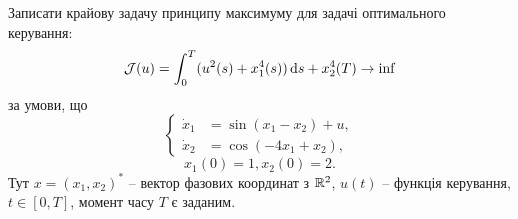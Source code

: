 \begin{problem}
    Записати крайову задачу принципу максимуму для задачі оптимального керування:
    \begin{equation*}
        \mathcal{J}(u) = \int_0^T (u^2(s) + x_1^4(s)) \mathop{}\!\mathrm{d} s + x_2^4(T) \to \inf
    \end{equation*}
    за умови, що
    \[ \left\{ \begin{aligned}
        \dot x_1 &= \sin(x_1 - x_2) + u, \\
        \dot x_2 &= \cos(-4x_1 + x_2),
    \end{aligned} \right. \]
    \begin{equation*}
        x_1(0) = 1, x_2(0) = 2.
    \end{equation*}
    Тут $x = (x_1, x_2)^*$ -- вектор фазових координат з $\mathbb{R}^2$, $u(t)$ -- функція керування, $t \in [0, T]$, момент часу $T$ є заданим.
\end{problem}

